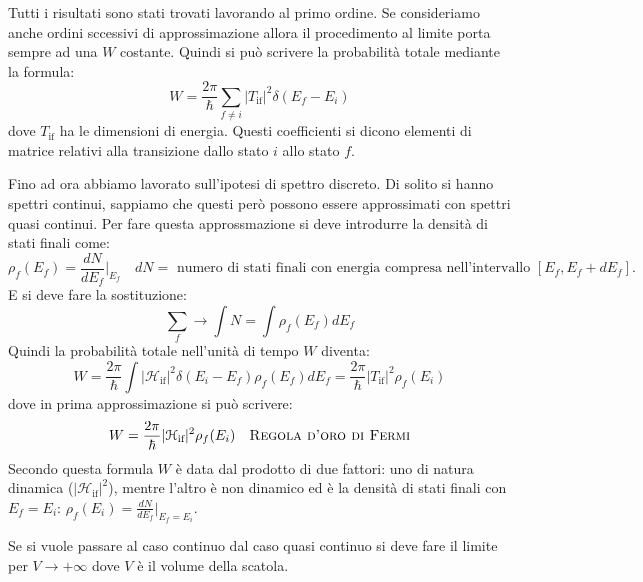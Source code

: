 Tutti i risultati sono stati trovati lavorando al primo ordine. Se consideriamo anche ordini sccessivi di approssimazione allora il procedimento al limite porta sempre ad una $W$ costante.
Quindi si può scrivere la probabilità totale mediante la formula:
\[
W=\frac{2\pi}{\hbar}\sum_{f\neq i}|T_{\text{if}}|^2\delta(E_f-E_i)
\]
dove $T_{\text{if}}$ ha le dimensioni di energia. Questi coefficienti si dicono elementi di matrice relativi alla transizione dallo stato $i$ allo stato $f$.

Fino ad ora abbiamo lavorato sull'ipotesi di spettro discreto. Di solito si hanno spettri continui, sappiamo che questi però possono essere approssimati con spettri quasi continui.
Per fare questa approssmazione si deve introdurre la densità di stati finali come:
\[
\rho_f(E_f)=\frac{dN}{dE_f}|_{E_f}\quad\text{$dN=$ numero di stati finali con energia compresa nell'intervallo $[E_f,E_f+dE_f]$.}
\]
E si deve fare la sostituzione:
\[
\sum_f\rightarrow\int N=\int\rho_f(E_f)dE_f
\]
Quindi la probabilità totale nell'unità di tempo $W$ diventa:
\[
W=\frac{2\pi}{\hbar}\int|\mathcal{H}_{\text{if}}|^2\delta(E_i-E_f)\rho_f(E_f)dE_f=\frac{2\pi}{\hbar}|T_{\text{if}}|^2\rho_f(E_i)
\]
dove in prima approssimazione si può scrivere:
\[
W=\frac{2\pi}{\hbar}|\mathcal{H}_{\text{if}}|^2\rho_f(E_i)\quad\text{\textsc{Regola d'oro
di Fermi}}
\]
Secondo questa formula $W$ è data dal prodotto di due fattori: uno di natura dinamica ($|\mathcal{H}_{\text{if}}|^2$), mentre l'altro è non dinamico ed è la densità
di stati finali con $E_f=E_i$: $\rho_f(E_i)=\frac{dN}{dE_f}|_{E_f=E_i}$.

Se si vuole passare al caso continuo dal caso quasi continuo si deve fare il limite per $V\rightarrow+\infty$ dove $V$ è il volume della scatola.

